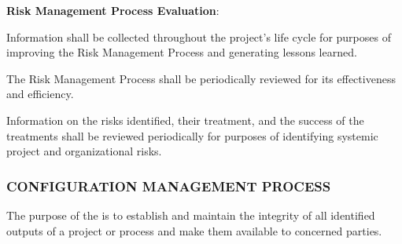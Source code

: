 \begin{adjustwidth}{2em}{0pt}
\begin{compactenum}
					\item {\bf Risk Management Process Evaluation}:

					\begin{compactenum}
						\item Information shall be collected throughout the project's life cycle for purposes of improving the Risk Management Process and generating lessons learned.

						\item The Risk Management Process shall be periodically reviewed for its effectiveness and efficiency.

						\item Information on the risks identified, their treatment, and the success of the treatments shall be reviewed periodically for purposes of identifying systemic project and organizational risks.
					\end{compactenum}

				\end{compactenum}

			\end{adjustwidth}

		\newpage
		\subsubsection{CONFIGURATION MANAGEMENT PROCESS\label{proc:configuration_management_process}}

			\begin{adjustwidth}{2em}{0pt} 

				The purpose of the  is to establish and maintain the integrity of all identified outputs of a project or process and make them available to concerned parties.

			\end{adjustwidth}

